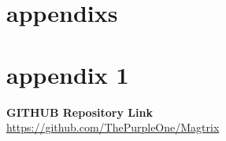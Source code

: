 \stopcontents[default]
\resumecontents[annexes]
\chapter*{appendixs}

\chapter*{appendix 1}

\begin{center}
	\textbf{GITHUB Repository Link}\\
	\href{https://github.com/ThePurpleOne/Magtrix}{https://github.com/ThePurpleOne/Magtrix}
\end{center}


\stopcontents[annexes]
\resumecontents[default]

